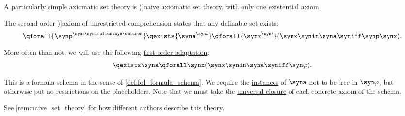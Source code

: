 \begin{definition}\label{def:naive_set_theory}\mimprovised
  A particularly simple \hyperref[def:axiomatic_set_theory]{axiomatic set theory} is \term[ru=наивная теория множеств, en=naive axiomatic set theory (\Textcite[xii]{Andrews2002Logic})]{naive axiomatic set theory}, with only one existential axiom.

  \begin{thmenum}
     The second-order \term[en=unrestricted comprehension (\cite[240]{Mimram2020ProgramEqualsProof})]{axiom of unrestricted comprehension} states that any definable set exists:
    \begin{equation}\label{eq:def:naive_set_theory/comprehension/sol}
      \qforall {\synp^{\syn\iota \synimplies \syn\omicron}} \qexists {\syna^{\syn\iota}} \qforall {\synx^{\syn\iota}} (\synx \synin \syna \syniff \synp \synx).
    \end{equation}

    More often than not, we will use the following \hyperref[def:fol_adaptation_of_monadic_sol_theory]{first-order adaptation}:
    \begin{equation}\label{eq:def:naive_set_theory/comprehension}
      \qexists \syna \qforall \synx (\synx \synin \syna \syniff \syn\varphi).
    \end{equation}

    This is a formula schema in the sense of \cref{def:fol_formula_schema}. We require the \hyperref[con:schemas_and_instances]{instances} of \( \syna \) not to be free in \( \syn\varphi \), but otherwise put no restrictions on the placeholders. Note that we must take the \hyperref[def:fol_quantifier_closure]{universal closure} of each concrete axiom of the schema.
  \end{thmenum}
\end{definition}
\begin{comments}
  \item See \cref{rem:naive_set_theory} for how different authors describe this theory.
\end{comments}

